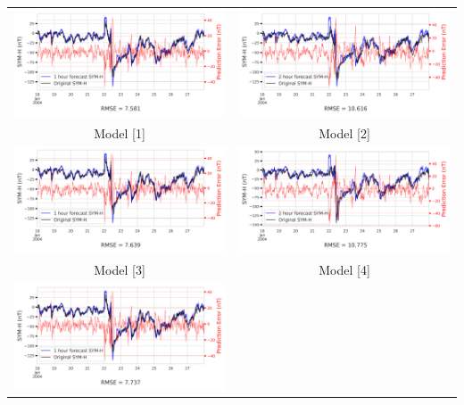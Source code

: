 \documentclass[draft,sw]{agutexSI2019}
\begin{document}
\begin{table}
\centering
\begin{tabular}{cc}
\includegraphics[width=0.49\linewidth]{paper_plots/1h_swics/1h_swics_storm_36.png}
&
\includegraphics[width=0.49\linewidth]{paper_plots/2h_swics/2h_swics_storm_36.png}
\\
Model [1] & Model [2]
\vspace*{12pt}
\\
\includegraphics[width=0.49\linewidth]{paper_plots/1h_no_swics/1h_no_swics_storm_36.png}
&
\includegraphics[width=0.49\linewidth]{paper_plots/2h_no_swics/2h_no_swics_storm_36.png}
\\
Model [3] & Model [4]
\vspace*{12pt}
\\
\includegraphics[width=0.49\linewidth]{paper_plots/1h_swics_model_on_no_swics/1h_swics_model_on_no_swics_storm_36.png}

\end{tabular}
\end{table}
\end{document}
